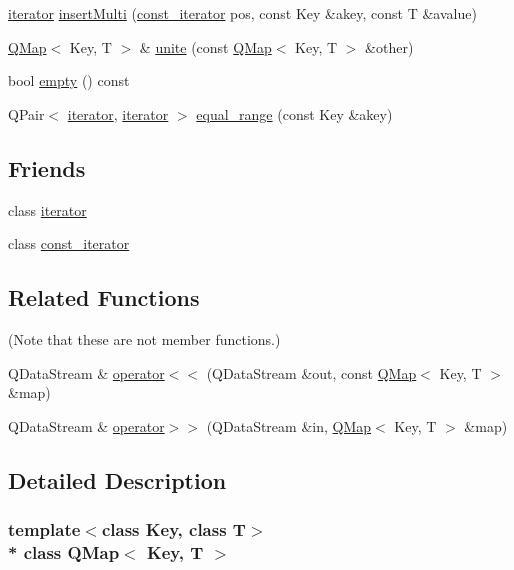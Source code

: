 \begin{DoxyCompactItemize}
\item 
\hyperlink{class_q_map_1_1iterator}{iterator} \hyperlink{class_q_map_ae3083c5d69f5792346d3e3ea29c12eb8}{insert\+Multi} (\hyperlink{class_q_map_1_1const__iterator}{const\+\_\+iterator} pos, const Key \&akey, const T \&avalue)
\item 
\hyperlink{class_q_map}{Q\+Map}$<$ Key, T $>$ \& \hyperlink{class_q_map_a4626753159700253f441ad14fdc12245}{unite} (const \hyperlink{class_q_map}{Q\+Map}$<$ Key, T $>$ \&other)
\item 
bool \hyperlink{class_q_map_a69fbff17a8cde71f44ecafbdb4c1c4e2}{empty} () const 
\item 
Q\+Pair$<$ \hyperlink{class_q_map_1_1iterator}{iterator}, \hyperlink{class_q_map_1_1iterator}{iterator} $>$ \hyperlink{class_q_map_a5d475ecfb48fba208a560e4e7139ed77}{equal\+\_\+range} (const Key \&akey)
\end{DoxyCompactItemize}
\subsection*{Friends}
\begin{DoxyCompactItemize}
\item 
class \hyperlink{class_q_map_a67171474c4da6cc8efe0c7fafefd2b2d}{iterator}
\item 
class \hyperlink{class_q_map_ac220ce1c155db1ac44146c12d178056f}{const\+\_\+iterator}
\end{DoxyCompactItemize}
\subsection*{Related Functions}
(Note that these are not member functions.) \begin{DoxyCompactItemize}
\item 
Q\+Data\+Stream \& \hyperlink{class_q_map_a4ab8793bbdb9c841c4dfccd174f8bd52}{operator$<$$<$} (Q\+Data\+Stream \&out, const \hyperlink{class_q_map}{Q\+Map}$<$ Key, T $>$ \&map)
\item 
Q\+Data\+Stream \& \hyperlink{class_q_map_af84c5c06c005047bb65a8c36edde06d0}{operator$>$$>$} (Q\+Data\+Stream \&in, \hyperlink{class_q_map}{Q\+Map}$<$ Key, T $>$ \&map)
\end{DoxyCompactItemize}


\subsection{Detailed Description}
\subsubsection*{template$<$class Key, class T$>$\\*
class Q\+Map$<$ Key, T $>$}

